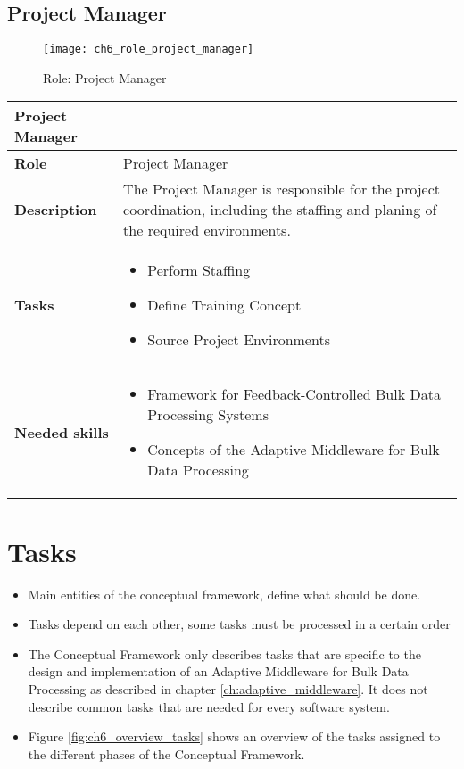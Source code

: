 \subsection{Project Manager}

\begin{figure}[htpb] \centering 
	\texttt{[image: ch6\_role\_project\_manager]} 
	\caption{Role: Project Manager} 
	\label{fig:ch6_role_project_manager} 
\end{figure}

\begin{tabularx}{\textwidth}{@{} l X @{}}
	\caption{table}{Project Manager} \label{table:ch6_Role_Project_Manager}\\
	\toprule
	\bfseries Role & Project Manager\\
	\midrule
	\bfseries Description & The Project Manager is responsible for the project coordination, including the staffing and planing of the required environments.\\
	\midrule
	\bfseries Tasks & 
	\begin{itemize}
		\item Perform Staffing
		\item Define Training Concept
		\item Source Project Environments
	\end{itemize}
	\\
	\midrule 
	\bfseries Needed skills &
	\begin{itemize}
		\item Framework for Feedback-Controlled Bulk Data Processing Systems
		\item Concepts of the Adaptive Middleware for Bulk Data Processing
	\end{itemize}
	\\
	\bottomrule
\end{tabularx}


\section{Tasks}
\label{sec:ch6_tasks}

\begin{itemize}
	\item Main entities of the conceptual framework, define what should be done.
	\item Tasks depend on each other, some tasks must be processed in a certain order
	\item The Conceptual Framework only describes tasks that are specific to the design and implementation of an Adaptive Middleware for Bulk Data Processing as described in chapter \ref{ch:adaptive_middleware}. It does not describe common tasks that are needed for every software system.
	\item Figure \ref{fig:ch6_overview_tasks} shows an overview of the tasks assigned to the different phases of the Conceptual Framework.
\end{itemize}


